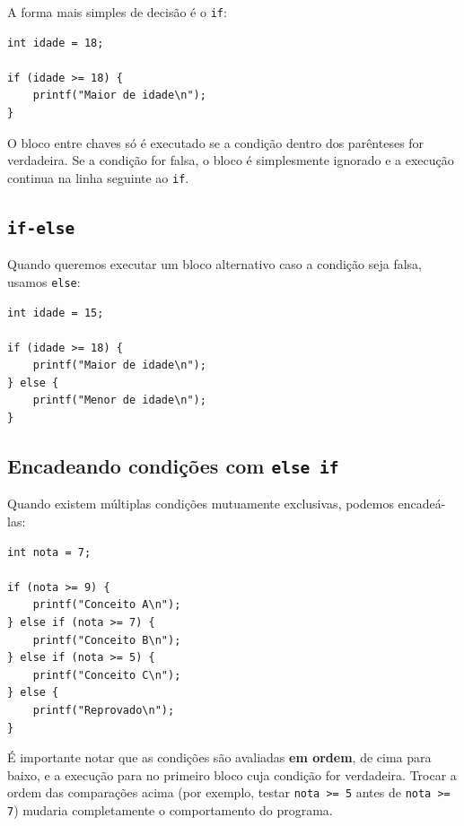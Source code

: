 \documentclass[12pt,a4paper,oneside]{extreport}
\begin{document}
A forma mais simples de decisão é o \texttt{if}:

\begin{lstlisting}
int idade = 18;

if (idade >= 18) {
    printf("Maior de idade\n");
}
\end{lstlisting}

O bloco entre chaves só é executado se a condição dentro dos parênteses for verdadeira. Se a condição for falsa, o bloco é simplesmente ignorado e a execução continua na linha seguinte ao \texttt{if}.

\subsection{\texttt{if-else}}

Quando queremos executar um bloco alternativo caso a condição seja falsa, usamos \texttt{else}:

\begin{lstlisting}
int idade = 15;

if (idade >= 18) {
    printf("Maior de idade\n");
} else {
    printf("Menor de idade\n");
}
\end{lstlisting}

\subsection{Encadeando condições com \texttt{else if}}

Quando existem múltiplas condições mutuamente exclusivas, podemos encadeá-las:

\begin{lstlisting}
int nota = 7;

if (nota >= 9) {
    printf("Conceito A\n");
} else if (nota >= 7) {
    printf("Conceito B\n");
} else if (nota >= 5) {
    printf("Conceito C\n");
} else {
    printf("Reprovado\n");
}
\end{lstlisting}

É importante notar que as condições são avaliadas \textbf{em ordem}, de cima para baixo, e a execução para no primeiro bloco cuja condição for verdadeira. Trocar a ordem das comparações acima (por exemplo, testar \texttt{nota >= 5} antes de \texttt{nota >= 7}) mudaria completamente o comportamento do programa.
\end{document}
